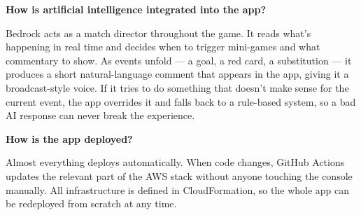 \documentclass[12pt]{article}
\begin{document}
\textbf{How is artificial intelligence integrated into the app?}

Bedrock acts as a match director throughout the game. It reads what's happening in real time and decides when to trigger mini-games and what commentary to show. As events unfold — a goal, a red card, a substitution — it produces a short natural-language comment that appears in the app, giving it a broadcast-style voice. If it tries to do something that doesn't make sense for the current event, the app overrides it and falls back to a rule-based system, so a bad AI response can never break the experience.

\textbf{How is the app deployed?}

Almost everything deploys automatically. When code changes, GitHub Actions updates the relevant part of the AWS stack without anyone touching the console manually. All infrastructure is defined in CloudFormation, so the whole app can be redeployed from scratch at any time.
\end{document}
